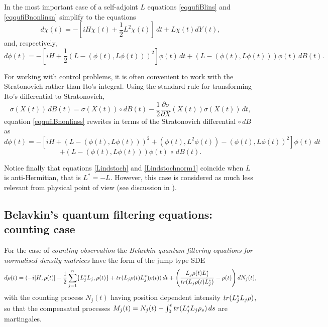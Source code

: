 \documentclass[10pt,a4paper]{amsart}
\def\tr{\rm{tr}}
\def\pa{\partial}
\newcommand{\si}{\sigma}
\begin{document}
In the most important case of a self-adjoint $L$ equations
\eqref{eqqufiBlins} and \eqref{eqqufiBnonlinsn} simplify to the equations
\begin{equation}
\label{eqqufiBlinss}
d\chi(t) =-[iH\chi(t) +\frac12 L^2 \chi(t) ]\,dt+L\chi(t) dY(t),
\end{equation}
and, respectively,
\begin{equation}
\label{eqqufiBnonlinss}
d\phi(t)=-[iH+\frac12 (L-(\phi(t), L \phi(t)))^2]\phi(t) \, dt
+ (L-(\phi(t), L \phi(t)))\phi(t) \, dB(t).
\end{equation}

For working with control problems, it is often convenient to work with the Stratonovich rather
than Ito's integral. Using the standard rule for transforming Ito's differential to Stratonovich,
\[
\si(X(t)) \, dB(t)=\si(X(t)) \circ dB(t)-\frac12 \frac{\pa \si}{\pa X}(X(t)) \si(X(t)) \, dt,
\]
equation \eqref{eqqufiBnonlinss} rewrites in terms of the Stratonovich differential $\circ \, dB$ as
\[
d\phi(t)=-[iH+(L-(\phi(t), L \phi(t)))^2 + (\phi(t), L^2 \phi(t))-(\phi(t), L \phi(t))^2 ]\phi(t) \, dt
\]
\begin{equation}
\label{eqqufiBnonlinssStr}
+ (L-(\phi(t), L \phi(t)))\phi(t) \, \circ \, dB(t).
\end{equation}

Notice finally that equations \eqref{Lindstoch} and \eqref{Lindstochnorm1} coincide when $L$ is anti-Hermitian,
that is $L^*=-L$. However, this case is considered as much less relevant from
physical point of view (see discussion in \cite{BarchBook}).

\subsection{Belavkin's quantum filtering equations: counting case}

For the case of {\it counting observation} the {\it Belavkin quantum filtering equations
for normalised density matrices} have the form of the jump type SDE
\begin{equation}
\label{eqBeleqcountj}
d\rho(t)=(- i[H, \rho(t)] -\frac12 \sum_{j=1}^n \{L_j^*L_j,\rho(t)\}+ {\tr} (L_j\rho(t) L_j^*) \rho(t) )\, dt
+\left(\frac{L_j\rho(t) L_j^*}{{\tr} (L_j\rho(t) L_j^*)}-\rho(t)\right) dN_j(t),
\end{equation}
with the counting process $N_j(t)$ having position dependent intensity ${\tr} (L_j^*L_j\rho)$,
so that the compensated processes $M_j(t)=N_j(t)-\int_0^t {\tr} (L_j^*L_j\rho_s) \, ds$ are martingales.
\end{document}
